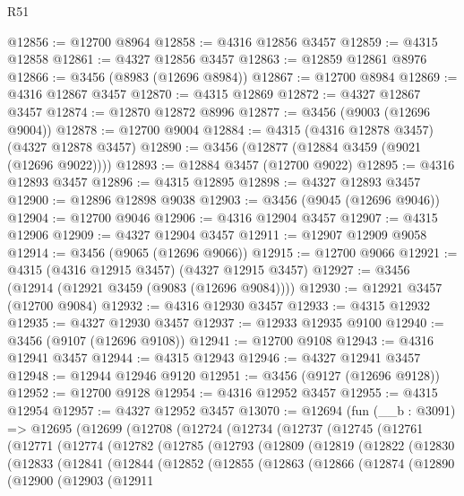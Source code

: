 \begin{lexlean}{R51}
\begin{coremodule}
@12856 := @12700 @8964
@12858 := @4316 @12856 @3457
@12859 := @4315 @12858
@12861 := @4327 @12856 @3457
@12863 := @12859 @12861 @8976
@12866 := @3456 (@8983 (@12696 @8984))
@12867 := @12700 @8984
@12869 := @4316 @12867 @3457
@12870 := @4315 @12869
@12872 := @4327 @12867 @3457
@12874 := @12870 @12872 @8996
@12877 := @3456 (@9003 (@12696 @9004))
@12878 := @12700 @9004
@12884 := @4315 (@4316 @12878 @3457) (@4327 @12878 @3457)
@12890 := @3456 (@12877 (@12884 @3459 (@9021 (@12696 @9022))))
@12893 := @12884 @3457 (@12700 @9022)
@12895 := @4316 @12893 @3457
@12896 := @4315 @12895
@12898 := @4327 @12893 @3457
@12900 := @12896 @12898 @9038
@12903 := @3456 (@9045 (@12696 @9046))
@12904 := @12700 @9046
@12906 := @4316 @12904 @3457
@12907 := @4315 @12906
@12909 := @4327 @12904 @3457
@12911 := @12907 @12909 @9058
@12914 := @3456 (@9065 (@12696 @9066))
@12915 := @12700 @9066
@12921 := @4315 (@4316 @12915 @3457) (@4327 @12915 @3457)
@12927 := @3456 (@12914 (@12921 @3459 (@9083 (@12696 @9084))))
@12930 := @12921 @3457 (@12700 @9084)
@12932 := @4316 @12930 @3457
@12933 := @4315 @12932
@12935 := @4327 @12930 @3457
@12937 := @12933 @12935 @9100
@12940 := @3456 (@9107 (@12696 @9108))
@12941 := @12700 @9108
@12943 := @4316 @12941 @3457
@12944 := @4315 @12943
@12946 := @4327 @12941 @3457
@12948 := @12944 @12946 @9120
@12951 := @3456 (@9127 (@12696 @9128))
@12952 := @12700 @9128
@12954 := @4316 @12952 @3457
@12955 := @4315 @12954
@12957 := @4327 @12952 @3457
@13070 := @12694
    (fun (__b : @3091) =>
    @12695
      (@12699
        (@12708
          (@12724
            (@12734
              (@12737
                (@12745
                  (@12761
                    (@12771
                      (@12774
                        (@12782
                          (@12785
                            (@12793
                              (@12809
                                (@12819
                                  (@12822
                                    (@12830
                                      (@12833
                                        (@12841
                                          (@12844
                                            (@12852
                                              (@12855
                                                (@12863
                                                  (@12866
                                                    (@12874
                                                      (@12890
                                                        (@12900
                                                          (@12903
                                                            (@12911

\end{coremodule}
\end{lexlean}
